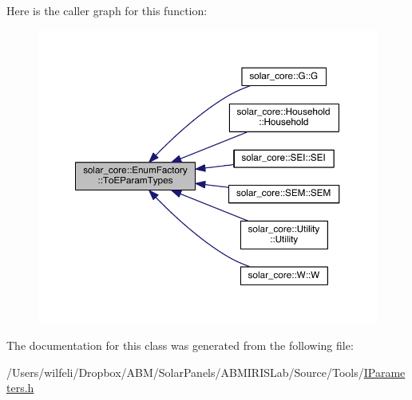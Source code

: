 Here is the caller graph for this function\+:
\nopagebreak
\begin{figure}[H]
\begin{center}
\leavevmode
\includegraphics[width=350pt]{classsolar__core_1_1_enum_factory_a573986ee0b4951d5ecc6a8c100f892e8_icgraph}
\end{center}
\end{figure}




The documentation for this class was generated from the following file\+:\begin{DoxyCompactItemize}
\item 
/\+Users/wilfeli/\+Dropbox/\+A\+B\+M/\+Solar\+Panels/\+A\+B\+M\+I\+R\+I\+S\+Lab/\+Source/\+Tools/\hyperlink{_i_parameters_8h}{I\+Parameters.\+h}\end{DoxyCompactItemize}
